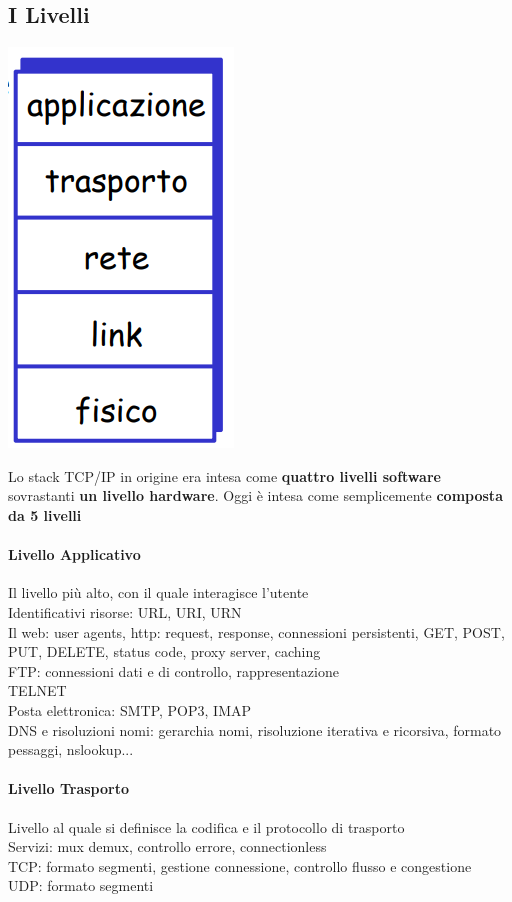 \documentclass[10pt]{article}
\begin{document}
\begin{multicols}{2}
\subsection{I Livelli}
\includegraphics[scale=0.8]{stacktcpip.png}
\columnbreak


Lo stack TCP/IP in origine era intesa come \textbf{quattro livelli software} sovrastanti \textbf{un livello hardware}. Oggi è intesa come semplicemente \textbf{composta da 5 livelli}
\paragraph{Livello Applicativo} Il livello più alto, con il quale interagisce l'utente\\
Identificativi risorse: URL, URI, URN\\
Il web: user agents, http: request, response, connessioni persistenti, GET, POST, PUT, DELETE, status code, proxy server, caching\\
FTP: connessioni dati e di controllo, rappresentazione\\
TELNET\\
Posta elettronica: SMTP, POP3, IMAP\\
DNS e risoluzioni nomi: gerarchia nomi, risoluzione iterativa e ricorsiva, formato pessaggi, nslookup...
\paragraph{Livello Trasporto} Livello al quale si definisce la codifica e il protocollo di trasporto\\
Servizi: mux demux, controllo errore, connectionless\\
TCP: formato segmenti, gestione connessione, controllo flusso e congestione\\
UDP: formato segmenti

\end{multicols}
\end{document}

